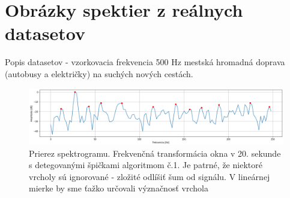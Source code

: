 \section{Obrázky spektier z reálnych datasetov}

Popis datasetov - vzorkovacia frekvencia 500 Hz mestská hromadná doprava (autobusy a električky) na suchých nových cestách.

\begin{figure}[h]
   \centering
    \includegraphics[width=\textwidth]{figures/verification/L83-slice-t-20-A1.png}
   \caption{Prierez spektrogramu. Frekvenčná transformácia okna v 20. sekunde s detegovanými špičkami algoritmom č.1. Je patrné, že
   niektoré vrcholy sú ignorované - zložité odlíšiť šum od signálu. V lineárnej mierke by sme ťažko určovali význačnosť vrchola}
\end{figure} 


